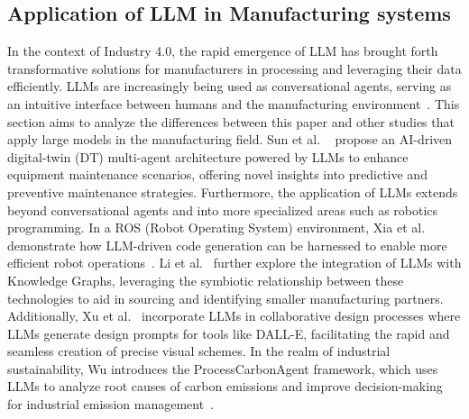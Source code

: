 \documentclass[preprint,12pt]{elsarticle}
\begin{document}
\subsection{Application of LLM in Manufacturing systems}
In the context of Industry 4.0, the rapid emergence of LLM has brought forth transformative solutions for manufacturers in processing and leveraging their data efficiently. 
LLMs are increasingly being used as conversational agents, serving as an intuitive interface between humans and the manufacturing environment~\cite{colabianchi2023human}. 
This section aims to analyze the differences between this paper and other studies that apply large models in the manufacturing field.
Sun et al. ~\cite{sun2024empowering} propose an AI-driven digital-twin (DT) multi-agent architecture powered by LLMs to enhance equipment maintenance scenarios, offering novel insights into predictive and preventive maintenance strategies. 
Furthermore, the application of LLMs extends beyond conversational agents and into more specialized areas such as robotics programming. In a ROS (Robot Operating System) environment, Xia et al. demonstrate how LLM-driven code generation can be harnessed to enable more efficient robot operations~\cite{XIA2024102728}. 
Li et al.~\cite{li2024building} further explore the integration of LLMs with Knowledge Graphs, leveraging the symbiotic relationship between these technologies to aid in sourcing and identifying smaller manufacturing partners. 
Additionally, Xu et al.~\cite{xu2024llm} incorporate LLMs in collaborative design processes where LLMs generate design prompts for tools like DALL-E, facilitating the rapid and seamless creation of precise visual schemes.
In the realm of industrial sustainability, Wu introduces the ProcessCarbonAgent framework, which uses LLMs to analyze root causes of carbon emissions and improve decision-making for industrial emission management~\cite{wu2024processcarbonagent}. 
\end{document}
